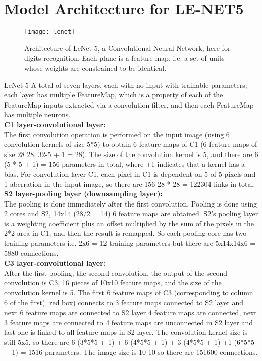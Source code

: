 \documentclass[thesis]{deutez}
\begin{document}
\section{Model Architecture for LE-NET5}
\begin{figure}[h!]
	\centering
	\texttt{[image: lenet]}
	\caption{Architecture of LeNet-5, a Convolutional Neural Network, here for digits recognition. Each plane is a feature map, i.e. a set of units
		whose weights are constrained to be identical.}
\end{figure}
\FloatBarrier
LeNet-5 A total of seven layers, each with no input with trainable parameters; each layer has multiple FeatureMap, which is a property of each of the FeatureMap inputs extracted via a convolution filter, and then each FeatureMap has multiple neurons.\\
\textbf{C1 layer-convolutional layer:}\\
The first convolution operation is performed on the input image (using 6 convolution kernels of size 5*5) to obtain 6 feature maps of C1 (6 feature maps of size 28 28, 32-5 + 1 = 28). The size of the convolution kernel is 5, and there are 6 (5 * 5 + 1) = 156 parameters in total, where +1 indicates that a kernel has a bias. For convolution layer C1, each pixel in C1 is dependent on 5 of 5 pixels and 1 aberration in the input image, so there are 156 28 * 28 = 122304 links in total.\cite{lenet}\\
\textbf{S2 layer-pooling layer (downsampling layer):}\\
The pooling is done immediately after the first convolution. Pooling is done using 2 cores and S2, 14x14 (28/2 = 14) 6 feature maps are obtained. S2's pooling layer is a weighting coefficient plus an offset multiplied by the sum of the pixels in the 2*2 area in C1, and then the result is remapped. So each pooling core has two training parameters i.e. 2x6 = 12 training parameters but there are 5x14x14x6 = 5880 connections.\cite{lenet}\\
\textbf{C3 layer-convolutional layer:}\\
After the first pooling, the second convolution, the output of the second convolution is C3, 16 pieces of 10x10 feature maps, and the size of the convolution kernel is 5. The first 6 feature maps of C3 (corresponding to column 6 of the first). red box) connects to 3 feature maps connected to S2 layer and next 6 feature maps are connected to S2 layer 4 feature maps are connected, next 3 feature maps are connected to 4 feature maps are unconnected in S2 layer and last one is linked to all feature maps in S2 layer. The convolution kernel size is still 5x5, so there are 6 (3*5*5 + 1) + 6 (4*5*5 + 1) + 3 (4*5*5 + 1) +1 (6*5*5 + 1) = 1516 parameters. The image size is 10 10 so there are 151600 connections.\cite{lenet}\\
\end{document}
